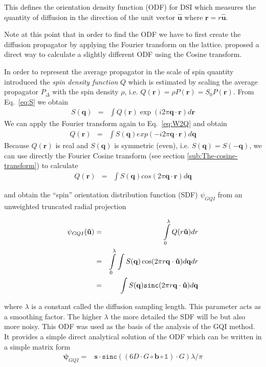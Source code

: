\documentclass{bioinfo}
\begin{document}
\noindent This defines the orientation
density function (ODF) for DSI which measures the quantity of diffusion
in the direction of the unit vector $\mathbf{\hat{u}}$ where $\mathbf{r=}r\hat{\mathbf{u}}$.

Note at this point that in order to find the ODF we have to first create
the diffusion propagator by applying the Fourier transform on the
lattice. \citet{Yeh2010} proposed a direct way to calculate a slightly
different ODF using the Cosine transform.

In order to represent the average propagator in the scale of spin
quantity \citet{Yeh2010} introduced the \emph{spin density
  function }$Q$ which is estimated by scaling the average propagator
$P_{\Delta}$ with the spin density $\rho$, i.e. $Q(\mathbf{r})=\rho
P(\mathbf{r})=S_{0}P(\mathbf{r})$.  From Eq.~\ref{eq:S} we obtain
\begin{eqnarray} S(\mathbf{q}) & = & \int
  Q(\mathbf{r})\exp(i2\pi\mathbf{q}\cdot\mathbf{r})d\mathbf{r}\label{eq:W2Q}\end{eqnarray}
We can apply the Fourier transform again to Eq.~\ref{eq:W2Q} and
obtain\begin{eqnarray} Q(\mathbf{r}) & = & \int
  S(\mathbf{q})exp(-i2\pi\mathbf{q}\cdot\mathbf{r})d\mathbf{q}\label{eq:Q2S_complex}\end{eqnarray}
Because $Q(\mathbf{r})$ is real and
$S(\mathbf{q})$ is symmetric (even),
i.e. $S(\mathbf{q})=S(-\mathbf{q})$, we can use directly the Fourier
Cosine transform (see section \ref{sub:The-cosine-transform}) to
calculate\begin{eqnarray} Q(\mathbf{r}) & = & \int
  S(\mathbf{q})cos(2\pi\mathbf{q}\cdot\mathbf{r})d\mathbf{q}\label{eq:cosine_transform}\end{eqnarray}


\noindent and obtain the {}``spin'' orientation distribution function
(SDF) $\psi_{GQI}$ from an unweighted truncated radial projection

\begin{eqnarray}
\psi_{GQI}(\mathbf{\hat{u}}) & = & \intop_{0}^{\lambda}Q(r\mathbf{\hat{u}})dr\label{eq:SDF}\\
 & = & \intop_{0}^{\lambda}\int S(\mathbf{q})\cos(2\pi r\mathbf{q}\cdot\mathbf{\hat{u}})d\mathbf{q}dr\\
 & = & \int S(\mathbf{q})\mathtt{sinc}(2\pi r\mathbf{q}\cdot\mathbf{\hat{u}})d\mathbf{q}\end{eqnarray}


\noindent \noindent where $\lambda$ is a constant called the diffusion
sampling length. This parameter acts as a smoothing factor. The higher
$\lambda$ the more detailed the SDF will be but also more noisy.
This ODF was used as the basis of the analysis of the GQI method.
It provides a simple direct analytical solution of the ODF which can
be written in a simple matrix form\begin{eqnarray}
\bm{\psi}_{GQI}= & \mathbf{s}\cdot\mathtt{sinc}((6D\cdot G\circ\mathbf{b}\circ\mathbb{1})\cdot G)\lambda/\pi\label{eq:GQI_analytical}\end{eqnarray}
\end{document}

